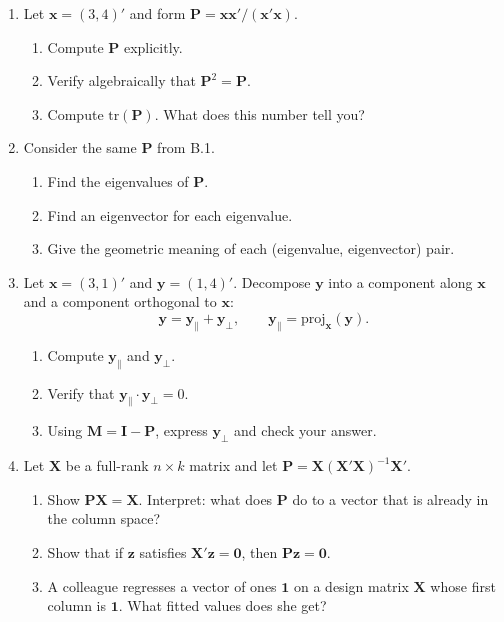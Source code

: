 \documentclass{article}
\begin{document}
\begin{enumerate}[label=\textbf{B.\arabic*},leftmargin=*,itemsep=10pt]

\item Let $\bm{x} = (3, 4)'$ and form $\bm{P} = \bm{x}\bm{x}'/(\bm{x}'\bm{x})$.
\begin{enumerate}[label=(\alph*)]
  \item Compute $\bm{P}$ explicitly.
  \item Verify algebraically that $\bm{P}^2 = \bm{P}$.
  \item Compute $\text{tr}(\bm{P})$.  What does this number tell you?
\end{enumerate}

\item Consider the same $\bm{P}$ from B.1.
\begin{enumerate}[label=(\alph*)]
  \item Find the eigenvalues of $\bm{P}$.
  \item Find an eigenvector for each eigenvalue.
  \item Give the geometric meaning of each (eigenvalue, eigenvector) pair.
\end{enumerate}

\item Let $\bm{x} = (3,1)'$ and $\bm{y} = (1,4)'$.  Decompose $\bm{y}$ into a component along $\bm{x}$ and a component orthogonal to $\bm{x}$:
$$\bm{y} = \bm{y}_\| + \bm{y}_\perp, \qquad \bm{y}_\| = \text{proj}_{\bm{x}}(\bm{y}).$$
\begin{enumerate}[label=(\alph*)]
  \item Compute $\bm{y}_\|$ and $\bm{y}_\perp$.
  \item Verify that $\bm{y}_\| \cdot \bm{y}_\perp = 0$.
  \item Using $\bm{M} = \bm{I} - \bm{P}$, express $\bm{y}_\perp$ and check your answer.
\end{enumerate}

\item Let $\bm{X}$ be a full-rank $n \times k$ matrix and let $\bm{P} = \bm{X}(\bm{X}'\bm{X})^{-1}\bm{X}'$.
\begin{enumerate}[label=(\alph*)]
  \item Show $\bm{P}\bm{X} = \bm{X}$.  Interpret: what does $\bm{P}$ do to a vector that is already in the column space?
  \item Show that if $\bm{z}$ satisfies $\bm{X}'\bm{z} = \bm{0}$, then $\bm{P}\bm{z} = \bm{0}$.
  \item A colleague regresses a vector of ones $\bm{1}$ on a design matrix $\bm{X}$ whose first column is $\bm{1}$.  What fitted values does she get?
\end{enumerate}


\end{enumerate}
\end{document}
